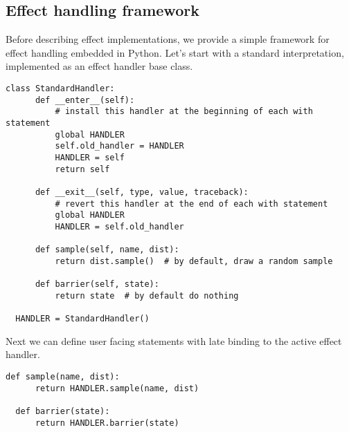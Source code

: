 \documentclass[anonymous=false, %
               format=acmsmall, %
               review=true, %
               screen=true, %
               nonacm=true]{acmart}
\begin{document}
\subsection{Effect handling framework}
Before describing effect implementations, we provide a simple framework for effect handling embedded in Python.
Let's start with a standard interpretation, implemented as an effect handler base class.
\begin{Verbatim}[samepage=true]
  class StandardHandler:
      def __enter__(self):
          # install this handler at the beginning of each with statement
          global HANDLER
          self.old_handler = HANDLER
          HANDLER = self
          return self

      def __exit__(self, type, value, traceback):
          # revert this handler at the end of each with statement
          global HANDLER
          HANDLER = self.old_handler

      def sample(self, name, dist):
          return dist.sample()  # by default, draw a random sample

      def barrier(self, state):
          return state  # by default do nothing

  HANDLER = StandardHandler()
\end{Verbatim}
Next we can define user facing statements with late binding to the active effect handler.
\begin{Verbatim}[samepage=true]
  def sample(name, dist):
      return HANDLER.sample(name, dist)

  def barrier(state):
      return HANDLER.barrier(state)
\end{Verbatim}
\end{document}
